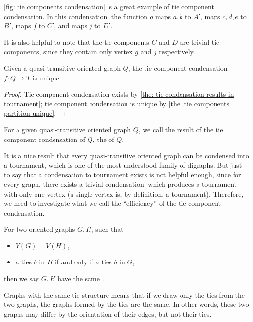 \cref{fig: tie components condensation} is a great example of
tie component condensation.
In this condensation, the function \(g\) maps \(a, b\) to \(A'\),
maps \(c, d, e\) to \(B'\), maps \(f\) to \(C'\),
and maps \(j\) to \(D'\).

It is also helpful to note that the tie components \(C\) and \(D\)
are trivial tie components,
since they contain only vertex \(g\) and \(j\) respectively.

\begin{corollary}\label{the: tie component condensation unique}
  Given a quasi-transitive oriented graph \(Q\),
  the tie component condensation
  \(f: Q \to T\) is unique.
\end{corollary}
\begin{proof}
  Tie component condensation exists by
  \cref{the: tie condensation results in tournament};
  tie component condensation is unique
  by \cref{the: tie components partition unique}.
\end{proof}

\begin{definition}
  For a given quasi-transitive oriented graph \(Q\),
  we call the result of the tie component condensation of \(Q\),
  the  of \(Q\).
\end{definition}

It is a nice result that every
quasi-transitive oriented graph
can be condensed into a tournament,
which is one of the most understood family of digraphs.
But just to say that a condensation to tournament exists
is not helpful enough,
since for every graph, there exists a trivial condensation,
which produces a tournament with only one vertex
(a single vertex is, by definition, a tournament).
Therefore, we need to investigate what we call
the ``efficiency'' of the tie component condensation.

\begin{definition}
  For two oriented graphs \(G, H\), such that
  \begin{itemize}
    \item \(V(G) = V(H)\),
    \item \(a\) ties \(b\) in \(H\) if and only if
      \(a\) ties \(b\) in \(G\),
  \end{itemize}
  then we say \(G, H\) have the same .
\end{definition}

Graphs with the same tie structure means
that if we draw only the ties from the two graphs,
the graphs formed by the ties are the same.
In other words, these two graphs may differ
by the orientation of their edges, but not their ties.

